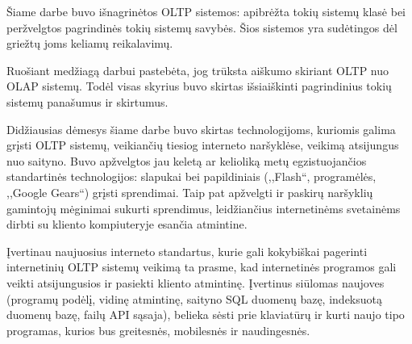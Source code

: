 \documentclass[12pt,a4paper,titlepage]{article}
\begin{document}
Šiame darbe buvo išnagrinėtos OLTP sistemos: apibrėžta tokių sistemų klasė bei peržvelgtos pagrindinės tokių sistemų savybės. Šios sistemos yra sudėtingos dėl griežtų joms keliamų reikalavimų.

Ruošiant medžiagą darbui pastebėta, jog trūksta aiškumo skiriant OLTP nuo OLAP sistemų. Todėl visas skyrius buvo skirtas išsiaiškinti pagrindinius tokių sistemų panašumus ir skirtumus.

Didžiausias dėmesys šiame darbe buvo skirtas technologijoms, kuriomis galima grįsti OLTP sistemų, veikiančių tiesiog interneto naršyklėse, veikimą atsijungus nuo saityno. Buvo apžvelgtos jau keletą ar kelioliką metų egzistuojančios standartinės technologijos: slapukai bei papildiniais (,,Flash``, programėlės, ,,Google Gears``) grįsti sprendimai. Taip pat apžvelgti ir paskirų naršyklių gamintojų mėginimai sukurti sprendimus, leidžiančius internetinėms svetainėms dirbti su kliento kompiuteryje esančia atmintine.

Įvertinau naujuosius interneto standartus, kurie gali kokybiškai pagerinti internetinių OLTP sistemų veikimą ta prasme, kad internetinės programos gali veikti atsijungusios ir pasiekti kliento atmintinę. Įvertinus siūlomas naujoves (programų podėlį, vidinę atmintinę, saityno SQL duomenų bazę, indeksuotą duomenų bazę, failų API sąsaja), belieka sėsti prie klaviatūrų ir kurti naujo tipo programas, kurios bus greitesnės, mobilesnės ir naudingesnės.

\end{document}
